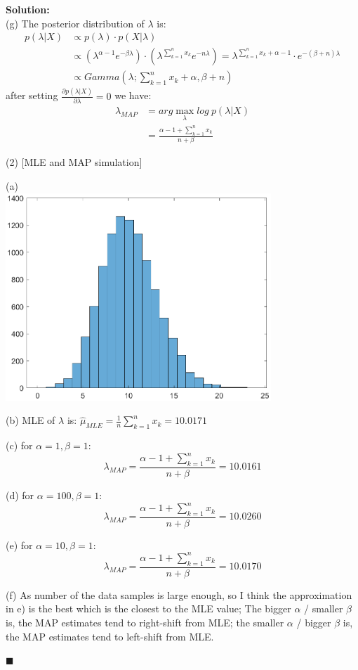 \documentclass{article}
\newenvironment{solution}                               %
{\textbf{Solution:} \\}{$\blacksquare$\newline}         %
\begin{document}
\begin{solution}
        (g) The posterior distribution of $\lambda$ is:
        \begin{align*}
            p(\lambda | X) &\propto p(\lambda) \cdot p(X|\lambda) \\
            &\propto
                (\lambda^{\alpha -1} e^{-\beta \lambda}) \cdot
                (\lambda^{\sum_{k=1}^{n} x_k} e^{-n\lambda})
             = \lambda^{\sum_{k=1}^{n} x_k + \alpha -1} \cdot e^{-(\beta+n) \lambda} \\
            &\propto Gamma(\lambda;\sum_{k=1}^{n} x_k + \alpha, \beta+n)
        \end{align*}
        after setting $\frac{\partial p(\lambda|X)}{\partial \lambda} = 0$ we have:
        \begin{align*}
            \lambda_{MAP} &= arg\max_{\lambda}log\ p(\lambda | X) \\
            &= \frac{\alpha - 1 + \sum_{k=1}^{n} x_k}{n + \beta}
        \end{align*}

        (2) [MLE and MAP simulation]

        (a) \\
        \includegraphics[width=0.75\textwidth]{images/a1_histo.eps}
        
        (b) MLE of $\lambda$ is: 
        $\hat{\mu}_{MLE} = \frac{1}{n} \sum\limits_{k=1}^{n} x_k = 10.0171$

        (c) for $\alpha=1, \beta=1$:
        $$
        \lambda_{MAP} = \frac{\alpha - 1 + \sum_{k=1}^{n} x_k}{n + \beta} = 10.0161
        $$

        (d) for $\alpha=100, \beta=1$:
        $$
        \lambda_{MAP} = \frac{\alpha - 1 + \sum_{k=1}^{n} x_k}{n + \beta} = 10.0260
        $$

        (e) for $\alpha=10, \beta=1$:
        $$
        \lambda_{MAP} = \frac{\alpha - 1 + \sum_{k=1}^{n} x_k}{n + \beta} = 10.0170
        $$

        (f) As number of the data samples is large enough, so I think the approximation in e) is the best which is the closest to the MLE value; 
        The bigger $\alpha$ / smaller $\beta$ is, the MAP estimates tend to right-shift from MLE; the smaller $\alpha$ / bigger $\beta$ is, the MAP estimates tend to left-shift from MLE.

    \end{solution}
\end{document}
